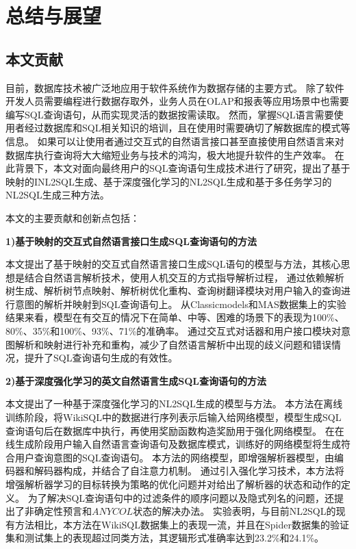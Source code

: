 \chapter{总结与展望}
\label{chap:conculution}
\section{本文贡献}

目前，数据库技术被广泛地应用于软件系统作为数据存储的主要方式。
除了软件开发人员需要编程进行数据存取外，业务人员在OLAP和报表等应用场景中也需要编写SQL查询语句，从而实现灵活的数据按需读取。
然而，掌握SQL语言需要使用者经过数据库和SQL相关知识的培训，且在使用时需要确切了解数据库的模式等信息。
如果可以让使用者通过交互式的自然语言接口甚至直接使用自然语言来对数据库执行查询将大大缩短业务与技术的鸿沟，极大地提升软件的生产效率。
在此背景下，本文对面向最终用户的SQL查询语句生成技术进行了研究，提出了基于映射的INL2SQL生成、基于深度强化学习的NL2SQL生成和基于多任务学习的NL2SQL生成三种方法。

本文的主要贡献和创新点包括：

\textbf{1)基于映射的交互式自然语言接口生成SQL查询语句的方法}

本文提出了基于映射的交互式自然语言接口生成SQL语句的模型与方法，其核心思想是结合自然语言解析技术，使用人机交互的方式指导解析过程，
通过依赖解析树生成、解析树节点映射、解析树优化重构、查询树翻译模块对用户输入的查询进行意图的解析并映射到SQL查询语句上。
从Classicmodels和MAS数据集上的实验结果来看，模型在有交互的情况下在简单、中等、困难的场景下的表现为100\%、80\%、35\%和100\%、93\%、71\%的准确率。
通过交互式对话器和用户接口模块对意图解析和映射进行补充和重构，减少了自然语言解析中出现的歧义问题和错误情况，提升了SQL查询语句生成的有效性。


\textbf{2)基于深度强化学习的英文自然语言生成SQL查询语句的方法}

本文提出了一种基于深度强化学习的NL2SQL生成的模型与方法。
本方法在离线训练阶段，将WikiSQL中的数据进行序列表示后输入给网络模型，模型生成SQL查询语句后在数据库中执行，再使用奖励函数构造奖励用于强化网络模型。
在在线生成阶段用户输入自然语言查询语句及数据库模式，训练好的网络模型将生成符合用户查询意图的SQL查询语句。
本方法的网络模型，即增强解析器模型，由编码器和解码器构成，并结合了自注意力机制。
通过引入强化学习技术，本方法将增强解析器学习的目标转换为策略的优化问题并对给出了解析器的状态和动作的定义。
为了解决SQL查询语句中的过滤条件的顺序问题以及隐式列名的问题，还提出了非确定性预言和$ANYCOL$状态的解决办法。
实验表明，与目前NL2SQL的现有方法相比，本方法在WikiSQL数据集上的表现一流，并且在Spider数据集的验证集和测试集上的表现超过同类方法，其逻辑形式准确率达到23.2\%和24.1\%。


